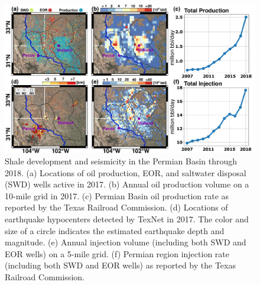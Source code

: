 \begin{figure}[hbt!]
	\centering
	\includegraphics[width=0.99\linewidth]{figures/chapter4-grl/supplement/figureS1-cisr-data.pdf}
	\caption[Shale development and seismicity in the Permian Basin.]{Shale development and seismicity in the Permian Basin through 2018. 
		(a) Locations of oil production, EOR, and saltwater disposal (SWD) wells active in 2017. (b) Annual oil production volume on a 10-mile grid in 2017. (c) Permian Basin oil production rate as reported by the Texas Railroad Commission. (d) Locations of earthquake hypocenters detected by TexNet in 2017. The color and size of a circle indicates the estimated earthquake depth and magnitude. (e) Annual injection volume (including both SWD and EOR wells) on a 5-mile grid. (f) Permian region injection rate (including both SWD and EOR wells) as reported by the Texas Railroad Commission.
	}
	\label{fig:permian-oil-6panel}
\end{figure}





%
%




